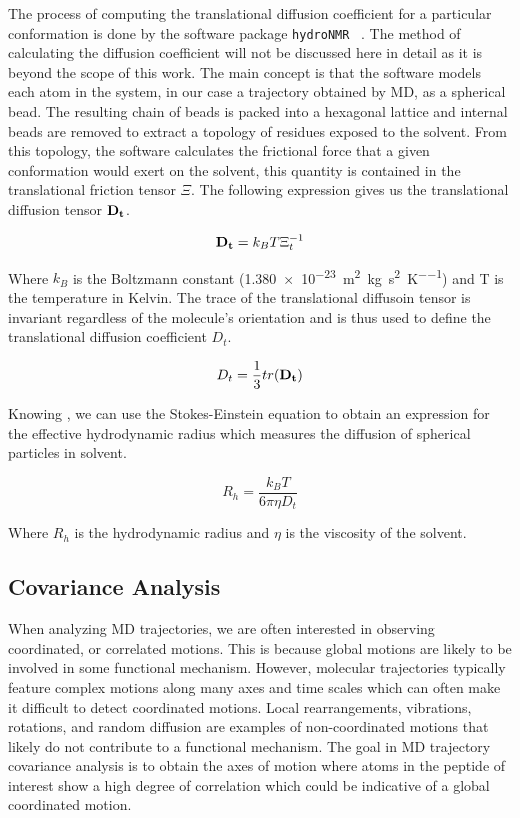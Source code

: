 The process of computing the translational diffusion coefficient for a particular conformation is done by the software package \texttt{hydroNMR} ~\cite{de2000hydronmr}. The method of calculating the diffusion coefficient will not be discussed here in detail as it is beyond the scope of this work. The main concept is that the software models each atom in the system, in our case a trajectory obtained by MD, as a spherical bead. The resulting chain of beads is packed into a hexagonal lattice and internal beads are removed to extract a topology of residues exposed to the solvent. From this topology, the software calculates the frictional force that a given conformation would exert on the solvent, this quantity is contained in the translational friction tensor $\Xi$. The following expression gives us the translational diffusion tensor $\mathbf{D_t}$.

\begin{equation}
\mathbf{D_{t}} = k_BT\Xi_{t}^{-1}
\end{equation}

Where $k_B$ is the Boltzmann constant (\SI{1.380e-23}{\square\metre\kilo\gram\per\square\second\per\kelvin}) and T is the temperature in Kelvin. The trace of the translational diffusoin tensor is invariant regardless of the molecule's orientation and is thus used to define the translational diffusion coefficient $D_t$.

\begin{equation}
D_t = \frac{1}{3}tr(\mathbf{D_t})
\end{equation}

Knowing \diffusion, we can use the Stokes-Einstein equation to obtain an expression for the effective hydrodynamic radius which measures the diffusion of spherical particles in solvent.

\begin{equation}
R_h = \frac{k_{B}T}{6\pi \eta D_{t}}
\end{equation}

Where $R_h$ is the hydrodynamic radius and $\eta$ is the viscosity of the solvent.

\subsection{Covariance Analysis}

When analyzing MD trajectories, we are often interested in observing coordinated, or correlated motions. This is because global motions are likely to be involved in some functional mechanism. However, molecular trajectories typically feature complex motions along many axes and time scales which can often make it difficult to detect coordinated motions. Local rearrangements, vibrations, rotations, and random diffusion are examples of non-coordinated motions that likely do not contribute to a functional mechanism. The goal in MD trajectory covariance analysis is to obtain the axes of motion where atoms in the peptide of interest show a high degree of correlation which could be indicative of a global coordinated motion. 

